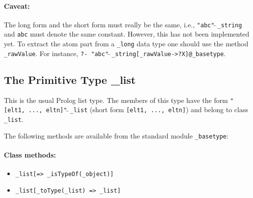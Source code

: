 \documentclass[11pt]{article}
\begin{document}
\paragraph{Caveat:} The long form and the short form must really be the
same, i.e., {\tt "abc"$\hat{~}\hat{~}$\_string} and {\tt abc} must denote the
same constant.  However, this has not been implemented yet.
To extract the atom part from a {\tt \_long}  data type one should use
the method {\tt \_rawValue}.  For instance, {\tt ?-
  "abc"$\hat{~}\hat{~}$\_string[\_rawValue->?X]@\_basetype}.


\subsection{ The Primitive Type \_list}

This is the usual Prolog list type.
The members of this type have the form 
{\tt "[elt1, ..., eltn]"$\hat{~}\hat{~}$\_list}
(short form {\tt [elt1, ..., eltn]}) and belong to class
{\tt \_list}. 

The following methods are available from the standard module {\tt \_basetype}: 
\paragraph{Class methods:}
\begin{itemize}
\item {\tt \_list[=> \_isTypeOf(\_object)]}  
\item {\tt \_list[\_toType(\_list) => \_list]}  
\end{itemize}
\end{document}
